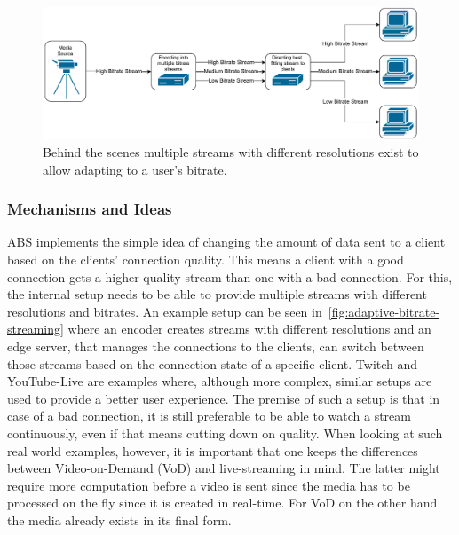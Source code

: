 \vspace{0.5cm}
\begin{figure}[H]
    \centering
    \includegraphics[width=\textwidth]{figures/02_background/adaptive-bitrate-streaming.drawio.pdf}
    \caption[Adaptive streaming schematic]{Behind the scenes multiple streams with different
    resolutions exist to allow adapting to a user's bitrate.}\label{fig:adaptive-bitrate-streaming}
\end{figure}
\vspace{1cm}

\subsubsection{Mechanisms and Ideas}
ABS implements the simple idea of changing the amount of data sent to a client 
based on the clients' connection quality.
This means a client with a good connection gets a higher-quality stream than 
one with a bad connection.
For this, the internal setup needs to be able to provide multiple streams with
different resolutions and bitrates.
An example setup can be seen in~\autoref{fig:adaptive-bitrate-streaming} where
an encoder creates streams with different resolutions and an edge server, that 
manages the connections to the clients, can switch between those streams based on
the connection state of a specific client.
Twitch and YouTube-Live are examples where, although more complex, similar setups
are used to provide a better user experience.
The premise of such a setup is that in case of a bad connection, it is still 
preferable to be able to watch a stream continuously, even if that means
cutting down on quality.
When looking at such real world examples, however, it is important that one keeps 
the differences between Video-on-Demand (VoD) and live-streaming in mind.
The latter might require more computation before a video is sent since the media 
has to be processed on the fly since it is created in real-time.
For VoD on the other hand the media already exists in its final form. 


